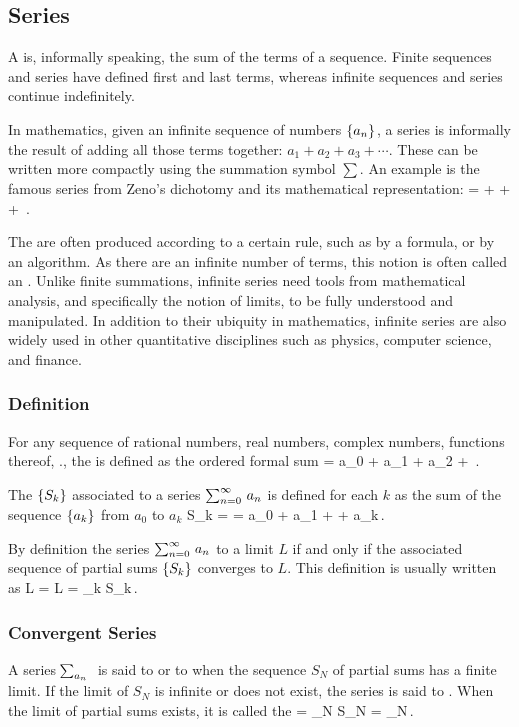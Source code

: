 \subsection{Series}
A  is, informally speaking, the sum of the terms of a sequence. Finite sequences and series have defined first and last terms, whereas infinite sequences and series continue indefinitely.

In mathematics, given an infinite sequence of numbers $\left\lbrace{{a_n}}\right\rbrace_{}^{}$, a series is informally the result of adding all those terms together: $a_1 + a_2 + a_3 + \dotsb$. These can be written more compactly using the summation symbol $\sum$. An example is the famous series from Zeno's dichotomy and its mathematical representation:
\beq
{} =  +  +  + \dotsb\,.
\eeq

The  are often produced according to a certain rule, such as by a formula, or by an algorithm. As there are an infinite number of terms, this notion is often called an . Unlike finite summations, infinite series need tools from mathematical analysis, and specifically the notion of limits, to be fully understood and manipulated. In addition to their ubiquity in mathematics, infinite series are also widely used in other quantitative disciplines such as physics, computer science, and finance.


\subsubsection{Definition}
For any sequence  of rational numbers, real numbers, complex numbers, functions thereof, \etc., the  is defined as the ordered formal sum 
\beq
{} = a_0 + a_1 + a_2 + \dotsc\,.
\eeq

The  $\left\lbrace{S_k}\right\rbrace$ associated to a series $\sum_{n = 0}^{\infty}\,{a_n}$ is defined for each $k$ as the sum of the sequence $\left\lbrace{{a_k}}\right\rbrace_{}^{}$ from $a_0$ to $a_k$
\beq
S_k =  = a_0 + a_1 + \dotsb + a_k\,.
\eeq

By definition the series $\sum_{n=0}^{\infty}\,{a_n}$  to a limit $L$ if and only if the associated sequence of partial sums $\left\lbrace{S_k}\right\rbrace$ converges to $L$. This definition is usually written as
\beq
L = \iff L = \lim_{k\to\infty} S_k\,.
\eeq

\subsubsection{Convergent Series}
A series $\sum_{a_n}^{}\,{}$ is said to  or to  when the sequence $S_N$ of partial sums has a finite limit. If the limit of $S_N$ is infinite or does not exist, the series is said to . When the limit of partial sums exists, it is called the 
\beq
{} = \lim_{N\to\infty} S_N = \lim_{N\to\infty}\,.
\eeq

